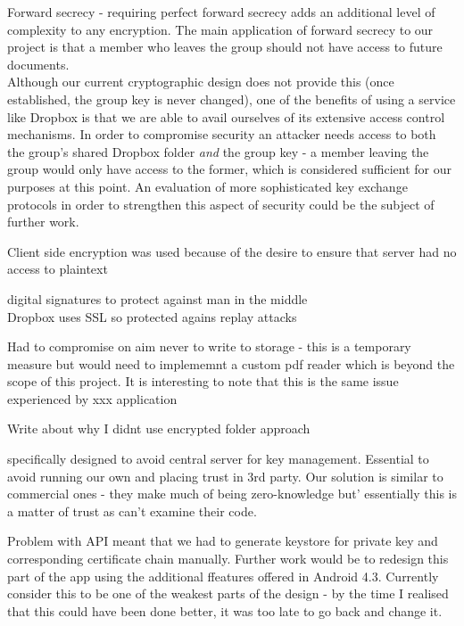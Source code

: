 Forward secrecy - requiring perfect forward secrecy adds an additional level of complexity to any encryption.   The main application of forward secrecy to our project is that a member who leaves the group should not have access to future documents.\\  Although our current cryptographic design does not provide this (once established, the group key is never changed), one of the benefits of using a service like Dropbox is that we are able to avail ourselves of its extensive access control mechanisms.  In order to compromise security an attacker needs access to both the group's shared Dropbox folder \textit{and } the group key - a member leaving the group would only have access to the former, which is considered sufficient for our purposes at this point.  An evaluation of more sophisticated key exchange protocols in order to strengthen this aspect of security could be the subject of further work. 

 
 Client side encryption was used because of the desire to ensure that server had no access to plaintext
 
 digital signatures to protect against man in the middle \\
 
 Dropbox uses SSL so protected agains replay attacks
 
 Had to compromise on aim never to write to storage - this is a temporary measure but would need to implememnt a custom pdf reader which is beyond the scope of this project.  It is interesting to note that this is the same issue experienced by xxx application
 
 Write about why I didnt use encrypted folder approach
 
 
specifically designed to avoid central server for key management.  Essential to avoid running our own and placing trust in 3rd party.  Our solution is similar to commercial ones - they make much of being zero-knowledge but' essentially this is a matter of trust as can't examine their code.
 
 Problem with API meant that we had to generate keystore for private key and corresponding certificate chain manually.  Further work would be to redesign this part of the app using the additional ffeatures offered in Android 4.3.  Currently consider this to be one of the weakest parts of the design - by the time I realised that this could have been done better, it was too late to go back and change it.
 
